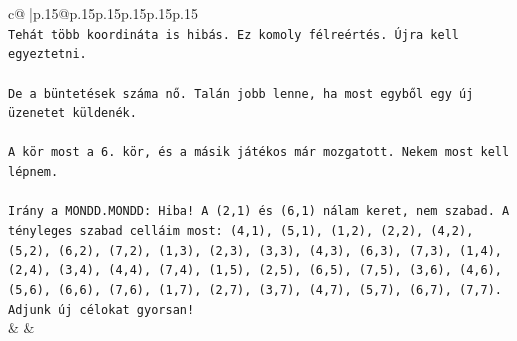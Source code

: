 \documentclass{article}
\begin{document}
{\begin{supertabular}{c@{$\;$}|p{.15\linewidth}@{}p{.15\linewidth}p{.15\linewidth}p{.15\linewidth}p{.15\linewidth}p{.15\linewidth}}
{{{\\ 
\texttt{Tehát több koordináta is hibás. Ez komoly félreértés. Újra kell egyeztetni.} \\
\\ 
\texttt{De a büntetések száma nő. Talán jobb lenne, ha most egyből egy új üzenetet küldenék.} \\
\\ 
\texttt{A kör most a 6. kör, és a másik játékos már mozgatott. Nekem most kell lépnem.} \\
\\ 
\texttt{Irány a MONDD.MONDD: Hiba! A (2,1) és (6,1) nálam keret, nem szabad. A tényleges szabad celláim most: (4,1), (5,1), (1,2), (2,2), (4,2), (5,2), (6,2), (7,2), (1,3), (2,3), (3,3), (4,3), (6,3), (7,3), (1,4), (2,4), (3,4), (4,4), (7,4), (1,5), (2,5), (6,5), (7,5), (3,6), (4,6), (5,6), (6,6), (7,6), (1,7), (2,7), (3,7), (4,7), (5,7), (6,7), (7,7). Adjunk új célokat gyorsan!} \\
            }
        }
    }
    & & \\ \\


\end{supertabular}}
\end{document}
